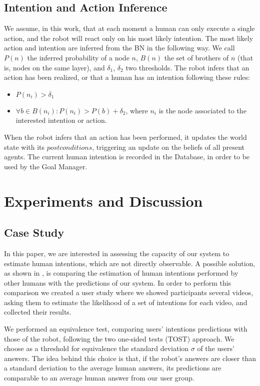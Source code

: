 \subsection{Intention and Action Inference}
\label{situation_assessment- intention and action inference}
We assume, in this work, that at each moment a human can only execute a single action, and the robot will react only on his most likely intention. The most likely action and intention are inferred from the BN in the following way. We call $P(n)$ the inferred probability of a node $n$, $B(n)$ the set of brothers of $n$ (that is, nodes on the same layer), and $\delta_1$, $\delta_2$ two thresholds. The robot infers that an action has been realized, or that a human has an intention following these rules: 
\begin{itemize}
\item  \(P(n_i)>\delta_1\) 
\item  \(\forall b \in B(n_i): P(n_i)>P(b)+\delta_2\), where $n_i$ is the node associated to the interested intention or action.
\end{itemize}

When the robot infers that an action has been performed, it updates the world state with its $postconditions$, triggering an update on the beliefs of all present agents. The current human intention is recorded in the Database, in order to be used by the Goal Manager.


\section{Experiments and Discussion}
\label{situation_assessment-experiments}
\subsection{Case Study}
In this paper, we are interested in assessing the capacity of our system to estimate human intentions, which are not directly observable. A possible solution, as shown in \cite{baker2014modeling}, is comparing the estimation of human intentions performed by other humans with the predictions of our system. In order to perform this comparison we created a user study where we showed participants several videos, asking them to estimate the likelihood of a set of intentions for each video, and collected their results. 

We performed an equivalence test, comparing users' intentions predictions with those of the robot, following the two one-sided tests (TOST) approach. We choose as a threshold for equivalence the standard deviation $\sigma$ of the users' answers. The idea behind this choice is that, if the robot's answers are closer than a standard deviation to the average human answers, its predictions are comparable to an average human answer from our user group. 

